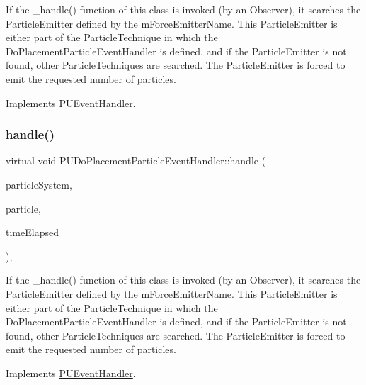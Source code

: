 If the \+\_\+handle() function of this class is invoked (by an Observer), it searches the Particle\+Emitter defined by the m\+Force\+Emitter\+Name. This Particle\+Emitter is either part of the Particle\+Technique in which the Do\+Placement\+Particle\+Event\+Handler is defined, and if the Particle\+Emitter is not found, other Particle\+Techniques are searched. The Particle\+Emitter is \textquotesingle{}forced\textquotesingle{} to emit the requested number of particles. 

Implements \hyperlink{classPUEventHandler_a760172609708c65548dcac364c9b3b9c}{P\+U\+Event\+Handler}.

\mbox{\label{classPUDoPlacementParticleEventHandler_a12d37fe5d03f1b25b5ba62020d792b3b}} 
\subsubsection{\texorpdfstring{handle()}{handle()}\hspace{0.1cm}{\footnotesize\ttfamily [2/2]}}
{\footnotesize\ttfamily virtual void P\+U\+Do\+Placement\+Particle\+Event\+Handler\+::handle (\begin{DoxyParamCaption}\item[{\hyperlink{classPUParticleSystem3D}{P\+U\+Particle\+System3D} $\ast$}]{particle\+System,  }\item[{\hyperlink{structPUParticle3D}{P\+U\+Particle3D} $\ast$}]{particle,  }\item[{float}]{time\+Elapsed }\end{DoxyParamCaption})\hspace{0.3cm}{\ttfamily [override]}, {\ttfamily [virtual]}}

If the \+\_\+handle() function of this class is invoked (by an Observer), it searches the Particle\+Emitter defined by the m\+Force\+Emitter\+Name. This Particle\+Emitter is either part of the Particle\+Technique in which the Do\+Placement\+Particle\+Event\+Handler is defined, and if the Particle\+Emitter is not found, other Particle\+Techniques are searched. The Particle\+Emitter is \textquotesingle{}forced\textquotesingle{} to emit the requested number of particles. 

Implements \hyperlink{classPUEventHandler_a760172609708c65548dcac364c9b3b9c}{P\+U\+Event\+Handler}.

